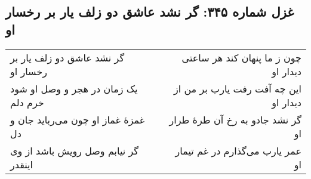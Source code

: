 \begin{center}
\section*{غزل شماره ۳۴۵: گر نشد عاشق دو زلف یار بر رخسار او}
\label{sec:345}
\begin{longtable}{l p{0.5cm} r}
گر نشد عاشق دو زلف یار بر رخسار او
&&
چون ز ما پنهان کند هر ساعتی دیدار او
\\
یک زمان در هجر و وصل او شود خرم دلم
&&
این چه آفت رفت یارب بر من از دیدار او
\\
غمزهٔ غماز او چون می‌رباید جان و دل
&&
گر نشد جادو به رخ آن طرهٔ طرار او
\\
گر نیابم وصل رویش باشد از وی اینقدر
&&
عمر یارب می‌گذارم در غم تیمار او
\\
\end{longtable}
\end{center}
